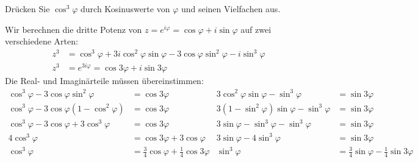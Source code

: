 Drücken Sie $\cos^3\varphi$ durch Kosinuswerte von $\varphi$ und seinen
Vielfachen aus.

\begin{loesung}
Wir berechnen die dritte Potenz von $z=e^{i\varphi}=\cos\varphi+i\sin\varphi$
auf zwei verschiedene Arten:
\begin{align*}
z^3
&=
\cos^3\varphi + 3i\cos^2\varphi\sin\varphi - 3 \cos\varphi\sin^2\varphi
-i\sin^3\varphi
\\
z^3
&=
e^{3i\varphi}=\cos3\varphi+i\sin3\varphi
\end{align*}
Die Real- und Imaginärteile müssen übereinstimmen:
\begin{align*}
\cos^3\varphi-3\cos\varphi\sin^2\varphi
&=
\cos3\varphi
&
3\cos^2\varphi\sin\varphi-\sin^3\varphi
&=
\sin3\varphi
\\
\cos^3\varphi-3\cos\varphi(1-\cos^2\varphi)
&=
\cos3\varphi
&
3(1-\sin^2\varphi)\sin\varphi-\sin^3\varphi
&=
\sin3\varphi
\\
\cos^3\varphi-3\cos\varphi + 3\cos^3\varphi
&=
\cos3\varphi
&
3\sin\varphi -\sin^3\varphi-\sin^3\varphi
&=
\sin3\varphi
\\
4\cos^3\varphi
&=
\cos3\varphi
+
3\cos\varphi
&
3\sin\varphi -4\sin^3\varphi
&=
\sin3\varphi
\\
\cos^3\varphi
&=
\frac34 \cos\varphi
+
\frac14 \cos3\varphi
&
\sin^3\varphi
&=
\frac34 \sin\varphi
-
\frac14\sin3\varphi
\end{align*}
\end{loesung}

